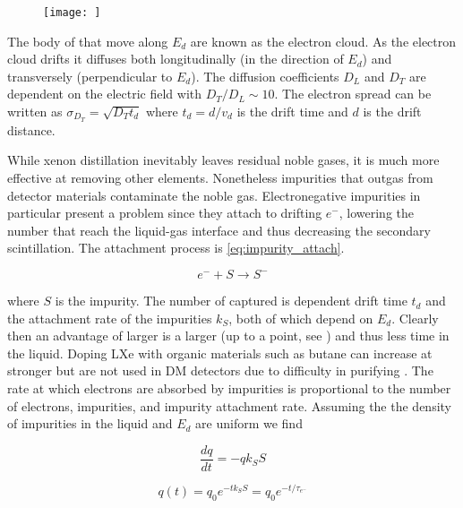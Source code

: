 \begin{figure}
\texttt{[image: ]}
\label{fig:tpcs_tpc}
\end{figure}

The body of \electron that move along $E_{d}$ are known as the electron cloud.  As the electron cloud drifts it diffuses both
longitudinally (in the direction of $E_{d}$) and transversely (perpendicular to $E_{d}$).  The
diffusion coefficients $D_{L}$ and $D_{T}$ are dependent on the electric field with $D_{T}/D_{L} \sim 10$.  The electron spread can
be written as $\sigma_{D_{T}} = \sqrt{D_{T} t_{d}}$ where $t_{d} = d/v_{d}$ is the drift time and $d$ is the drift distance.

While xenon distillation inevitably leaves residual noble gases, it is much more effective at removing other elements.  Nonetheless
impurities that outgas from detector materials contaminate the noble gas.  Electronegative impurities in particular present a problem
since they attach to drifting $e^{-}$,
lowering the number that reach the liquid-gas interface and thus decreasing the secondary scintillation.  The attachment process
is \eqref{eq:impurity_attach}.

\begin{equation}
e^{-} + S \rightarrow S^{-}
\label{eq:impurity_attach}
\end{equation}

\noindent where $S$ is the impurity.  The number of \electron captured is dependent drift time $t_{d}$ and the
attachment rate of
the impurities $k_{S}$, both of which depend on $E_{d}$.  Clearly then an advantage of larger
\efields is a larger
\vd (up to a point, see ) and thus less time in the liquid.  Doping LXe with organic materials such as butane
can increase \vd at stronger
\efields but are not used in DM detectors due to difficulty in purifying .  The rate at which electrons are
absorbed by impurities is proportional to the number of electrons, impurities, and impurity attachment rate.  Assuming the the density
of impurities in the liquid and $E_{d}$ are uniform we find

\begin{equation}
\frac{dq}{dt} = -qk_{S}S
\label{eq:lifetime_diff_eq}
\end{equation}

\begin{equation}
q(t) = q_{0}e^{-tk_{S}S} = q_{0}e^{-t/\tau_{e^-}}
\label{eq:lifetime_equation}
\end{equation}

